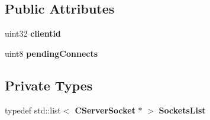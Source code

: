\subsection*{Public Attributes}
\begin{DoxyCompactItemize}
\item 
uint32 {\bfseries clientid}\label{classCServerConnect_a2da6a69e602fe07399e8d50e67315319}

\item 
uint8 {\bfseries pendingConnects}\label{classCServerConnect_ac70dacfe7f7829fdf7de7a6c7b76b9af}

\end{DoxyCompactItemize}
\subsection*{Private Types}
\begin{DoxyCompactItemize}
\item 
typedef std::list$<$ {\bf CServerSocket} $\ast$ $>$ {\bfseries SocketsList}\label{classCServerConnect_a934f75dee921dcfdbb054d54010d35d5}

\end{DoxyCompactItemize}
